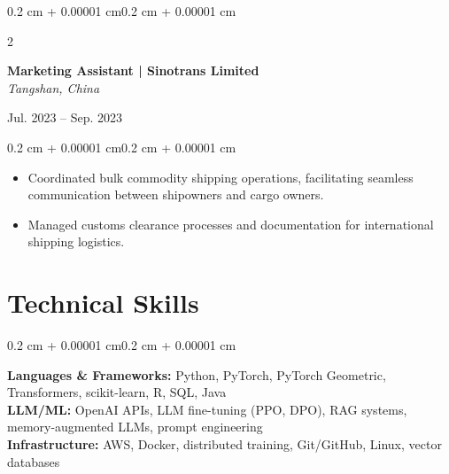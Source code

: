 \documentclass[10pt, letterpaper]{article}
\newenvironment{highlights}{
    \begin{itemize}[
        topsep=0.08 cm,
        parsep=0.08 cm,
        partopsep=0pt,
        itemsep=0pt,
        leftmargin=0.4 cm + 10pt
    ]
}{\end{itemize}}
\newenvironment{onecolentry}{
    \begin{adjustwidth}{0.2 cm + 0.00001 cm}{0.2 cm + 0.00001 cm}
}{\end{adjustwidth}}
\newenvironment{twocolentry}[2][]{
    \onecolentry
    \def\secondColumn{#2}
    \setcolumnwidth{\fill, 4.5 cm}
    \begin{paracol}{2}
}{
    \switchcolumn \raggedleft \secondColumn
    \end{paracol}
    \endonecolentry
}
\begin{document}
    \begin{twocolentry}{Jul. 2023 -- Sep. 2023}
        \textbf{Marketing Assistant | Sinotrans Limited}\\
        \textit{Tangshan, China}
    \end{twocolentry}
    \vspace{0.08 cm}
    \begin{onecolentry}
        \begin{highlights}
            \item Coordinated bulk commodity shipping operations, facilitating seamless communication between shipowners and cargo owners.
            \item Managed customs clearance processes and documentation for international shipping logistics.
        \end{highlights}
    \end{onecolentry}

    \section{Technical Skills}

    \begin{onecolentry}
        \textbf{Languages \& Frameworks:} Python, PyTorch, PyTorch Geometric, Transformers, scikit-learn, R, SQL, Java\\[2pt]
        \textbf{LLM/ML:} OpenAI APIs, LLM fine-tuning (PPO, DPO), RAG systems, memory-augmented LLMs, prompt engineering\\[2pt]
        \textbf{Infrastructure:} AWS, Docker, distributed training, Git/GitHub, Linux, vector databases
    \end{onecolentry}
\end{document}
